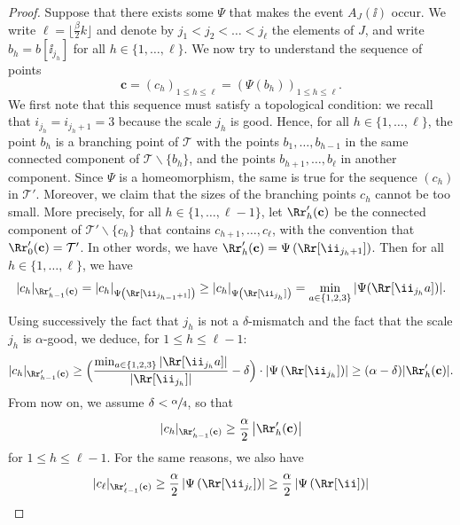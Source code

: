 \begin{proof}
Suppose that there exists some $\Psi$ that makes the event $A_J(\ii)$ occur.
We write $\ell=\lfloor \frac{\beta}{2}k \rfloor$ and denote by $j_1 < j_2 < \dots < j_{\ell}$ the elements of $J$, and write $b_h=b[\ii_{j_{h}}]$ for all $h\in\{1,\dots,\ell\}$.
We now try to understand the sequence of points
\[ \mathbf{c}=(c_h)_{1 \leq h \leq \ell} = \left( \Psi(b_h) \right)_{1 \leq h \leq \ell}.\]
We first note that this sequence must satisfy a topological condition: we recall that $i_{j_h}=i_{j_h+1}=3$ because the scale $j_h$ is good. Hence, for all $h\in\{1,\dots,\ell\}$, the point $b_h$ is a branching point of $\mathcal{T}$ with the points $b_1, \dots, b_{h-1}$ in the same connected component of $\mathcal{T} \backslash \{b_h\}$, and the points $b_{h+1}, \dots, b_{\ell}$ in another component.
Since $\Psi$ is a homeomorphism, the same is true for the sequence $(c_h)$ in $\mathcal{T}'$. Moreover, we claim that the sizes of the branching points $c_h$ cannot be too small.
More precisely, for all $h\in\{1,\dots,\ell-1\}$, let $\Rr'_h(\mathbf{c})$ be the connected component of $\mathcal{T}' \backslash \{ c_h\}$ that contains $c_{h+1}, \dots, c_{\ell}$, with the convention that $\Rr'_0(\mathbf{c})=\mathcal{T}'$.
In other words, we have $\Rr'_h(\mathbf{c})=\Psi \left( \Rr[\ii_{j_h+1}] \right)$.
Then for all $h\in\{1,\dots,\ell\}$, we have
\[ |c_h|_{\Rr'_{h-1}(\mathbf{c})} = |c_h|_{\Psi \left( \Rr[\ii_{j_{h-1}+1}]
\right)} \geq |c_h|_{\Psi \left( \Rr[\ii_{j_{h}}] \right)} = \min_{a \in \{1,2,3\}} | \Psi( \Rr[\ii_{j_h} a]) |.\]
Using successively the fact that $j_h$ is not a $\delta$-mismatch and the fact that the scale $j_h$ is $\alpha$-good, we deduce, for $1 \leq h \leq \ell-1$:
\begin{equation}\label{eqn_ci_not_too_small}
|c_h|_{\Rr'_{h-1}(\mathbf{c})} \geq \Bigl( \frac{\min_{a \in \{1,2,3\}} \left| \Rr[\ii_{j_h} a] \right| }{\left| \Rr[\ii_{j_h}] \right|} -\delta \Bigr) \cdot \left| \Psi \left( \Rr[\ii_{j_h}] \right) \right| \geq (\alpha-\delta) | \Rr'_h(\mathbf{c}) |.
\end{equation}
From now on, we assume $\delta<\sfrac{\alpha}{4}$, so that
\begin{align*}
|c_h|_{\Rr'_{h-1}(\mathbf{c})} \geq \frac{\alpha}{2} \left| \Rr'_h(\mathbf{c}) \right|
\end{align*}
for $1 \leq h \leq \ell-1$.
For the same reasons, we also have
\begin{align*}
|c_{\ell}|_{\Rr'_{\ell-1}(\mathbf{c})} \geq \frac{\alpha}{2} \left| \Psi \left( \Rr[\ii_{j_{\ell}}]\right) \right| \geq \frac{\alpha}{2} \left| \Psi \left( \Rr[\ii] \right) \right|

\end{align*}
\end{proof}
